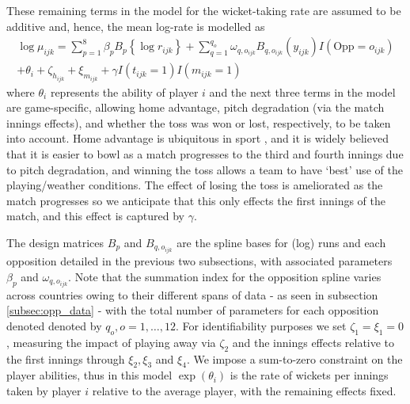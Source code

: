 \documentclass{statsoc}
\newcommand{\pmp}[1]{\textcolor{blue}{#1}}
\begin{document}
These remaining terms in the model for the wicket-taking rate are assumed to be additive and, hence, the mean log-rate is modelled as
\begin{multline}\label{eq:loglinmodel}
\log\mu_{ijk} = \sum_{p=1}^{8}\beta_{p} B_{p}\left\{\log r_{ijk} \right\} 
+ \sum_{q=1}^{q_o}\omega_{q, o_{ijk}} B_{q, o_{ijk}}(y_{ijk})I(\textrm{Opp} = o_{ijk}) \\
+ \theta_i  %
+ \zeta_{h_{ijk}} + \xi_{m_{ijk}} + \gamma I(t_{ijk} = 1) I(m_{ijk} = 1)
\end{multline}
where $\theta_i$ represents the ability of player $i$ and the next three terms in the model are game-specific, allowing home advantage, pitch degradation (via the match innings effects), and whether the toss was won or lost, respectively, to be taken into account. Home advantage is ubiquitous in sport \citep{Pollard2005}, and it is widely believed that  it is easier to bowl as a match progresses to the third and fourth innings due to pitch degradation, and winning the toss allows a team to have `best' use of the playing/weather conditions. The effect of losing the toss is ameliorated as the match progresses so we anticipate that this only effects the first innings of the match, and this effect is captured by $\gamma$.

The design matrices $B_p$ and $B_{q, o_{ijk}}$ are the spline bases for (log) runs and each opposition detailed in the previous two subsections, with associated parameters $\beta_p$ and $\omega_{q, o_{ijk}}$. Note that the summation index for the opposition spline varies across countries owing to their different spans of data - as seen in subsection \ref{subsec:opp_data} - with the total number of parameters for each opposition denoted denoted by $q_o, o = 1, \ldots, 12$.
For identifiability purposes we set $\zeta_1 = \xi_1 = 0$, measuring the impact of playing away via $\zeta_2$ and the innings effects relative to the first innings through $\xi_2, \xi_3$ and $\xi_4$. We impose a sum-to-zero constraint on the player abilities, thus in this model $\exp(\theta_i)$ is the rate of wickets per  innings taken by player $i$ relative to the average player, with the remaining effects fixed.
\end{document}
